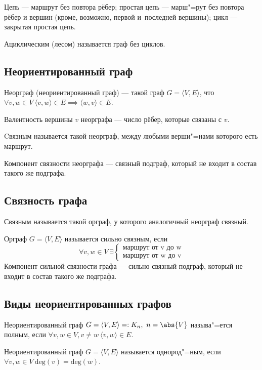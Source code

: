 {\ital Цепь} --- маршрут без повтора рёбер; {\ital простая цепь} --- марш"=рут без повтора рёбер и вершин {\ital\color{desc} (кроме, возможно, первой и~последней вершины)}; {\ital цикл} --- закрытая простая цепь.

{\ital Ациклическим {\color{desc} (лесом)}} называется граф без циклов.

\subsection{Неориентированный граф}

{\bold Неорграф} {\ital (неориентированный граф)} --- такой граф $G=\langle V,E\rangle$, что $\forall v,w\in V\ \langle v,w\rangle\in E\implies\langle w,v\rangle\in E$.

{\ital Валентность} вершины $v$ неорграфа --- число рёбер, которые связаны с $v$.

{\ital Cвязным} называется такой неорграф, между любыми верши"=нами которого есть маршрут.

{\ital Компонент связности} неорграфа --- связный подграф, который не входит в состав такого же подграфа.

\subsection{Связность графа}

{\ital Связным} называется такой орграф, у которого аналогичный неорграф связный.

Орграф $G=\langle V,E\rangle$ называется {\ital сильно связным}, если
$$\forall v,w\in V\ \exists
\begin{cases}
\text{маршрут от v до w}\\
\text{маршрут от w до v} 
\end{cases}$$
{\ital Компонент сильной связности} графа --- сильно связный подграф, который не входит в состав такого же подграфа.

\subsection{Виды неориентированных графов}

Неориентированный граф $G=\langle V,E\rangle=:K_n,\ n=\abs{V}$ называ"=ется {\ital полным}, если $\forall v,w\in V,v\neq w\ \langle v,w\rangle\in E$.

Неориентированный граф $G=\langle V,E\rangle$ называется {\ital однород"=ным}, если $\forall v,w\in V\ \text{deg}(v)=\text{deg}(w)$.

